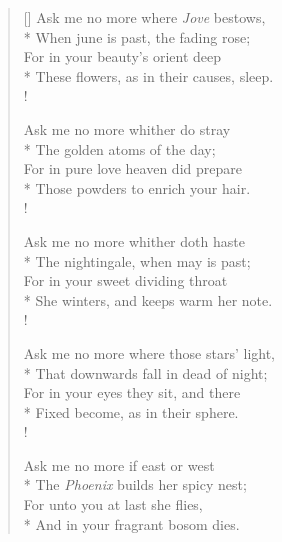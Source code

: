 \documentclass[MAIN]{subfiles}
\begin{document}
\settowidth{\versewidth}{These flowers, as in their causes, sleep.}
\begin{verse}[\versewidth]
Ask me no more where \emph{Jove} bestows,\\*
When june is past, the fading rose;\\
For in your beauty's orient deep\\*
These flowers, as in their causes, sleep.\\!

Ask me no more whither do stray\\*
The golden atoms of the day;\\
For in pure love heaven did prepare\\*
Those powders to enrich your hair.\\!

Ask me no more whither doth haste\\*
The nightingale, when may is past;\\
For in your sweet dividing throat\\*
She winters, and keeps warm her note.\\!

Ask me no more where those stars' light,\\*
That downwards fall in dead of night;\\
For in your eyes they sit, and there\\*
Fixed become, as in their sphere.\\!

Ask me no more if east or west\\*
The \emph{Phoenix} builds her spicy nest;\\
For unto you at last she flies,\\*
And in your fragrant bosom dies.
\end{verse}
\end{document}
